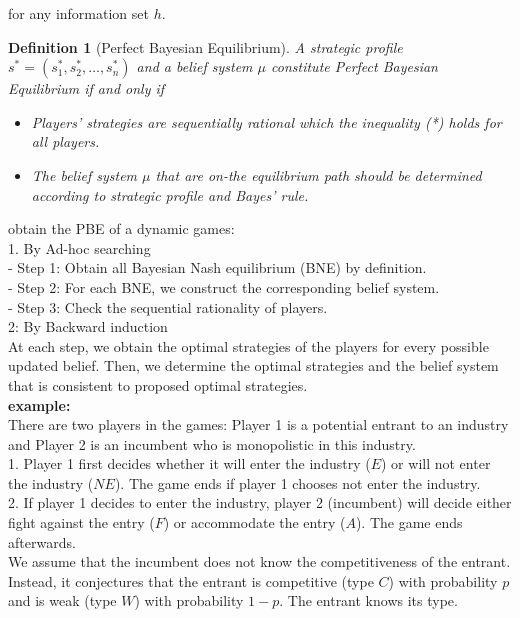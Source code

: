 \documentclass[twoside]{article}
\theoremstyle{definitionstyle}
\newtheorem*{definition}{Definition}
\begin{document}
for any information set $h$.
\begin{definition}[Perfect Bayesian Equilibrium]
    A strategic profile $s^* = (s_1^*, s_2^*, \ldots, s_n^*)$ and a belief system $\mu$ constitute Perfect 
Bayesian Equilibrium if and only if 
\begin{itemize}
\item Players' strategies are sequentially rational which the inequality (*) holds for all players. 
\item The belief system $\mu$ that are on-the equilibrium path should be determined according to strategic profile and Bayes' rule. 
\end{itemize}
\end{definition}
obtain the PBE of a dynamic games:\\
1. By Ad-hoc searching\\
- Step 1: Obtain all Bayesian Nash equilibrium (BNE) by definition.\\
- Step 2: For each BNE, we construct the corresponding belief system.\\
- Step 3: Check the sequential rationality of players.\\
2: By Backward induction\\
At each step, we obtain the optimal strategies of the players for every possible updated belief. 
Then, we determine the optimal strategies and the belief system that is consistent to proposed optimal strategies.\\
\newline
%
%
%
\textbf{example:}\\
There are two players in the games: Player 1 is a potential entrant to an industry and Player 2 is an incumbent who is monopolistic in this industry.\\
1. Player 1 first decides whether it will enter the industry ($E$) or will not enter the industry ($NE$). The game ends if player 1 chooses not enter the industry.\\
2. If player 1 decides to enter the industry, player 2 (incumbent) will decide either fight against the entry ($F$) or accommodate the entry ($A$). The game ends afterwards.\\
We assume that the incumbent does not know the competitiveness of the entrant. Instead, it conjectures that the entrant is competitive (type $C$) with probability $p$ and is weak (type $W$) with probability $1 - p$. The entrant knows its type.
\end{document}
